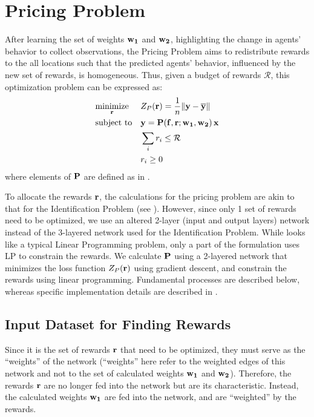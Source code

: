 \section{Pricing Problem} \label{sec:Pricing Problem}
After learning the set of weights $\mathbf{w_1}$ and $\mathbf{w_2}$, highlighting the change in agents' behavior to collect observations, the Pricing Problem aims to redistribute rewards to the all locations such that the predicted agents' behavior, influenced by the new set of rewards, is homogeneous. Thus, given a budget of rewards $\mathcal{R}$, this optimization problem can be expressed as:
\begin{equation} \label{eqn:pricing_problem}
    \begin{aligned}
        & \underset{\mathbf{r}}{\text{minimize}}
        & & Z_P(\mathbf{r}) = \frac{1}{n}\lVert \mathbf{y} - \overline{\mathbf{y}} \rVert\\
        & \text{subject to}
        & & \mathbf{y} = \mathbf{P}(\mathbf{f}, \mathbf{r}; \mathbf{w_1}, \mathbf{w_2}) \, \mathbf{x}\\
        &&& \sum_{i} r_i \leq \mathcal{R}\\
        &&& r_i \geq 0
    \end{aligned}
\end{equation}
where elements of $\mathbf{P}$ are defined as in .

To allocate the rewards $\mathbf{r}$, the calculations for the pricing problem are akin to that for the Identification Problem (see ). However, since only 1 set of rewards need to be optimized, we use an altered 2-layer (input and output layers) network instead of the 3-layered network used for the Identification Problem. While  looks like a typical Linear Programming problem, only a part of the formulation uses LP to constrain the rewards. We calculate $\mathbf{P}$ using a 2-layered network that minimizes the loss function $Z_P(\mathbf{r})$ using gradient descent, and constrain the rewards using linear programming. Fundamental processes are described below, whereas specific implementation details are described in .

\subsection{Input Dataset for Finding Rewards}
Since it is the set of rewards $\mathbf{r}$ that need to be optimized, they must serve as the ``weights'' of the network (``weights'' here refer to the weighted edges of this network and not to the set of calculated weights $\mathbf{w_1}$ and $\mathbf{w_2}$). Therefore, the rewards $\mathbf{r}$ are no longer fed into the network but are its characteristic. Instead, the calculated weights $\mathbf{w_1}$ are fed into the network, and are ``weighted'' by the rewards.

